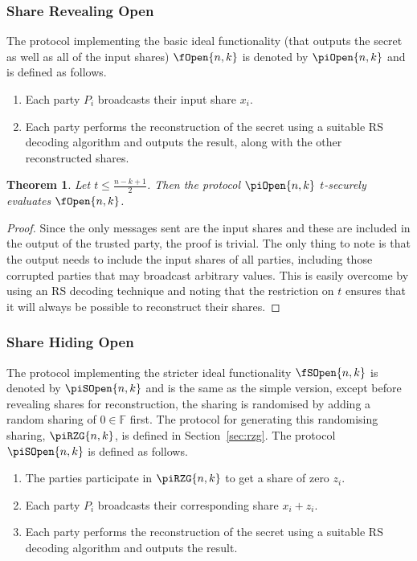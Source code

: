 \documentclass{article}
\newtheorem{theorem}{Theorem}
\theoremstyle{remark}
\newcommand{\F}{\mathbb{F}}
\begin{document}
\subsubsection{Share Revealing Open}

The protocol implementing the basic ideal functionality (that outputs the
secret as well as all of the input shares) $\fOpen{n,k}$ is denoted by
$\piOpen{n,k}$ and is defined as follows.

\begin{enumerate}
	\item Each party $P_i$ broadcasts their input share $x_i$.

	\item Each party performs the reconstruction of the secret using a suitable
		RS decoding algorithm and outputs the result, along with the other
		reconstructed shares.
\end{enumerate}

\begin{theorem}
	Let $t \le \frac{n - k + 1}{2}$. Then the protocol $\piOpen{n,k}$
	$t$-securely evaluates $\fOpen{n,k}$.
\end{theorem}

\begin{proof}
	Since the only messages sent are the input shares and these are included in
	the output of the trusted party, the proof is trivial. The only thing to
	note is that the output needs to include the input shares of all parties,
	including those corrupted parties that may broadcast arbitrary values. This
	is easily overcome by using an RS decoding technique and noting that the
	restriction on $t$ ensures that it will always be possible to reconstruct
	their shares.
\end{proof}

\subsubsection{Share Hiding Open}

The protocol implementing the stricter ideal functionality $\fSOpen{n,k}$ is
denoted by $\piSOpen{n,k}$ and is the same as the simple version, except before
revealing shares for reconstruction, the sharing is randomised by adding a
random sharing of $0 \in \F$ first. The protocol for generating this
randomising sharing, $\piRZG{n,k}$, is defined in Section~\ref{sec:rzg}. The
protocol $\piSOpen{n,k}$ is defined as follows.

\begin{enumerate}
	\item The parties participate in $\piRZG{n,k}$ to get a share of zero
		$z_i$.

	\item Each party $P_i$ broadcasts their corresponding share $x_i + z_i$.

	\item Each party performs the reconstruction of the secret using a suitable
		RS decoding algorithm and outputs the result.
\end{enumerate}
\end{document}
